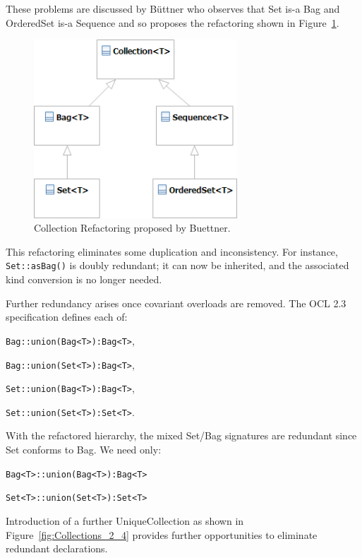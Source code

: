 \documentclass{eceasst}
\begin{document}
These problems are discussed by B\"{u}ttner\cite{Buttner} who observes that Set is-a Bag and OrderedSet is-a Sequence and so proposes the refactoring shown in Figure~\ref{fig:Collections_Buettner}.

\begin{figure}
  \begin{center}
    \includegraphics[width=3.0in]{Collections_Buettner.png}
  \end{center}
  \caption{Collection Refactoring proposed by Buettner.}
  \label{fig:Collections_Buettner}
\end{figure}

This refactoring eliminates some duplication and inconsistency. For instance, \verb|Set::asBag()| is doubly redundant;  it can now be inherited, and the associated kind conversion is no longer needed.

Further redundancy arises once covariant overloads are removed. The OCL 2.3 specification defines each of:

\verb|Bag::union(Bag<T>):Bag<T>|,

\verb|Bag::union(Set<T>):Bag<T>|,

\verb|Set::union(Bag<T>):Bag<T>|,

\verb|Set::union(Set<T>):Set<T>|.

With the refactored hierarchy, the mixed Set/Bag signatures are redundant since Set conforms to Bag. We need only:

\verb|Bag<T>::union(Bag<T>):Bag<T>|

\verb|Set<T>::union(Set<T>):Set<T>|

Introduction of a further UniqueCollection as shown in Figure~\ref{fig:Collections_2_4} provides further opportunities to eliminate redundant declarations.
\end{document}
